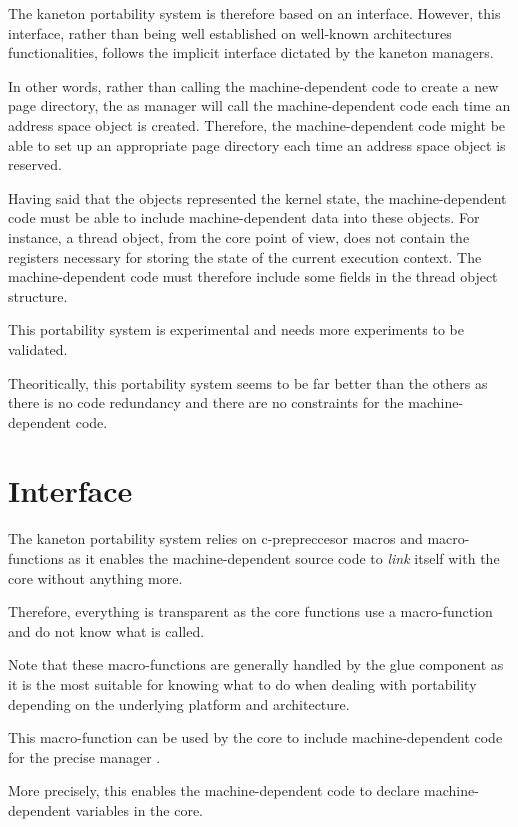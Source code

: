 The kaneton portability system is therefore based on an interface. However,
this interface, rather than being well established on well-known architectures
functionalities, follows the implicit interface dictated by the kaneton
managers.

In other words, rather than calling the machine-dependent code to create
a new page directory, the as manager will call the machine-dependent code
each time an address space object is created. Therefore, the
machine-dependent code might be able to set up an appropriate page directory
each time an address space object is reserved.

Having said that the objects represented the kernel state, the
machine-dependent code must be able to include machine-dependent data into
these objects. For instance, a thread object, from the core point of view,
does not contain the registers necessary for storing the state of the current
execution context. The machine-dependent code must therefore include some
fields in the thread object structure.

This portability system is experimental and needs more experiments to be
validated.

Theoritically, this portability system seems to be far better than the others
as there is no code redundancy and there are no constraints for the
machine-dependent code.

%
%

\section{Interface}

The kaneton portability system relies on c-prepreccesor macros and
macro-functions as it enables the machine-dependent source code to
\textit{link} itself with the core without anything more.

Therefore, everything is transparent as the core functions use a macro-function
and do not know what is called.

Note that these macro-functions are generally handled by the glue component
as it is the most suitable for knowing what to do when dealing with
portability depending on the underlying platform and architecture.

	 {
	   This macro-function can be used by the core to include
	   machine-dependent code for the precise manager .

	   \-

	   More precisely, this enables the machine-dependent code to declare
	   machine-dependent variables in the core.
	 }

